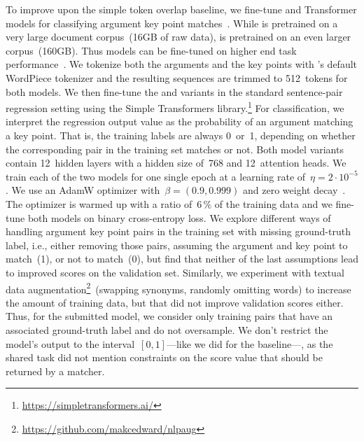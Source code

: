 To improve upon the simple token overlap baseline, we fine-tune \Bert and \Roberta Transformer models for classifying argument key point matches~\cite{DevlinCLT2019,LiuOGDJCLLZS2019}.
While \Bert is pretrained on a very large document corpus~(16GB of raw data), \Roberta is pretrained on an even larger corpus~(160GB).
Thus \Roberta models can be fine-tuned on higher end task performance~\cite{LiuOGDJCLLZS2019}.
We tokenize both the arguments and the key points with \Bert's default WordPiece tokenizer and the resulting sequences are trimmed to 512~tokens for both models.
We then fine-tune the \BertBase and \RobertaBase variants in the standard sentence-pair regression setting using the Simple Transformers library.\footnote{\url{https://simpletransformers.ai/}}
For classification, we interpret the regression output value as the probability of an argument matching a key point.
That is, the training labels are always 0~or~1, depending on whether the corresponding pair in the training set matches or not.
Both model variants contain 12~hidden layers with a hidden size of~768 and 12~attention heads.
We train each of the two models for one single epoch at a learning rate of~\( \eta = 2 \cdot 10^{-5} \).
We use an AdamW optimizer with~\( \beta = (0.9, 0.999) \) and zero weight decay~\cite{LoshchilovH2019}.
The optimizer is warmed up with a ratio of~6\,\% of the training data and we fine-tune both models on binary cross-entropy loss.
We explore different ways of handling argument key point pairs in the training set with missing ground-truth label, i.e., either removing those pairs, assuming the argument and key point to match~(1), or not to match~(0), but find that neither of the last assumptions lead to improved scores on the validation set.
Similarly, we experiment with textual data augmentation\footnote{\url{https://github.com/makcedward/nlpaug}}~(swapping synonyms, randomly omitting words) to increase the amount of training data, but that did not improve validation scores either.
Thus, for the submitted model, we consider only training pairs that have an associated ground-truth label and do not oversample.
We don't restrict the model's output to the interval~\([0,1]\)---like we did for the baseline---, as the shared task did not mention constraints on the score value that should be returned by a matcher.
